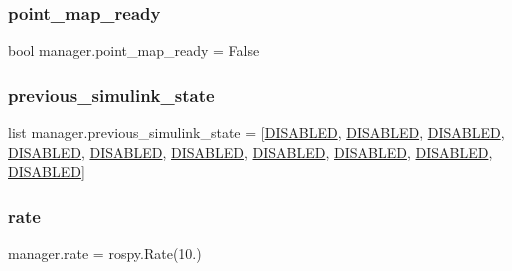 \mbox{\label{namespacemanager_a182c499b086b54bc448d101234319226}} 
\subsubsection{\texorpdfstring{point\+\_\+map\+\_\+ready}{point\_map\_ready}}
{\footnotesize\ttfamily bool manager.\+point\+\_\+map\+\_\+ready = False}

\mbox{\label{namespacemanager_af1c387f91036250d99a08f76b85353e3}} 
\subsubsection{\texorpdfstring{previous\+\_\+simulink\+\_\+state}{previous\_simulink\_state}}
{\footnotesize\ttfamily list manager.\+previous\+\_\+simulink\+\_\+state = \mbox{[}\hyperlink{namespacemanager_acc1a242f79d4757ccec1eafa25991b69}{D\+I\+S\+A\+B\+L\+ED}, \hyperlink{namespacemanager_acc1a242f79d4757ccec1eafa25991b69}{D\+I\+S\+A\+B\+L\+ED}, \hyperlink{namespacemanager_acc1a242f79d4757ccec1eafa25991b69}{D\+I\+S\+A\+B\+L\+ED}, \hyperlink{namespacemanager_acc1a242f79d4757ccec1eafa25991b69}{D\+I\+S\+A\+B\+L\+ED}, \hyperlink{namespacemanager_acc1a242f79d4757ccec1eafa25991b69}{D\+I\+S\+A\+B\+L\+ED}, \hyperlink{namespacemanager_acc1a242f79d4757ccec1eafa25991b69}{D\+I\+S\+A\+B\+L\+ED}, \hyperlink{namespacemanager_acc1a242f79d4757ccec1eafa25991b69}{D\+I\+S\+A\+B\+L\+ED}, \hyperlink{namespacemanager_acc1a242f79d4757ccec1eafa25991b69}{D\+I\+S\+A\+B\+L\+ED}, \hyperlink{namespacemanager_acc1a242f79d4757ccec1eafa25991b69}{D\+I\+S\+A\+B\+L\+ED}, \hyperlink{namespacemanager_acc1a242f79d4757ccec1eafa25991b69}{D\+I\+S\+A\+B\+L\+ED}\mbox{]}}

\mbox{\label{namespacemanager_aae333bf686b5b44cf7df44b5ea5c2234}} 
\subsubsection{\texorpdfstring{rate}{rate}}
{\footnotesize\ttfamily manager.\+rate = rospy.\+Rate(10.)}

